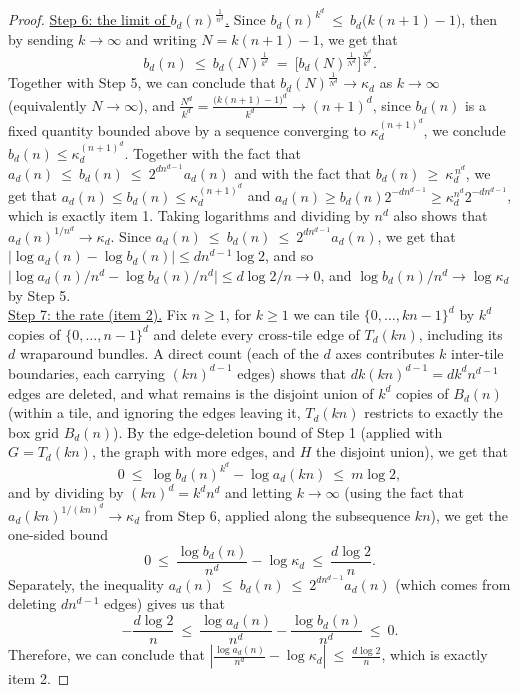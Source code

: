 \documentclass{article}
\theoremstyle{plain}
\theoremstyle{definition}
\theoremstyle{remark}
\begin{document}
\begin{proof}
\underline{Step 6: the limit of $b_d(n)^{\frac{1}{n^d}}$.} Since $b_d(n)^{k^d}\ \le\ b_d\big(k(n+1)-1\big)$, then by sending $k \to \infty$ and writing $N=k(n+1)-1$, we get that
\[
b_d(n)\ \le\ b_d(N)^{\frac{1}{k^d}}\ =\ \Big[b_d(N)^{\frac{1}{N^d}}\Big]^{\frac{N^d}{k^d}}.
\]
Together with Step 5, we can conclude that $b_d(N)^{\frac{1}{N^d}}\to\kappa_d$ as $k\to\infty$ (equivalently $N\to\infty$), and $\frac{N^d}{k^d}=\frac{\big(k(n+1)-1\big)^d}{k^d}\to(n+1)^d$, since $b_d(n)$ is a fixed quantity bounded above by a sequence converging to $\kappa_d^{(n+1)^d}$, we conclude $b_d(n)\le\kappa_d^{(n+1)^d}$. Together with the fact that $a_d(n)\ \le\ b_d(n)\ \le\ 2^{dn^{d-1}}a_d(n)$ and with the fact that $b_d(n)\ \ge\ \kappa_d^{\,n^d}$, we get that $a_d(n)\le b_d(n)\le\kappa_d^{(n+1)^d}$ and $a_d(n)\ge b_d(n)2^{-dn^{d-1}}\ge\kappa_d^{n^d}2^{-dn^{d-1}}$, which is exactly item 1. Taking logarithms and dividing by $n^d$ also shows that $a_d(n)^{1/n^d}\to\kappa_d$. Since $a_d(n)\ \le\ b_d(n)\ \le\ 2^{dn^{d-1}}a_d(n)$, we get that $|\log a_d(n)-\log b_d(n)|\le dn^{d-1}\log2$, and so $\big|\log a_d(n)/n^d-\log b_d(n)/n^d\big|\le d\log2/n\to0$, and $\log b_d(n)/n^d\to\log\kappa_d$ by Step 5.\\

\underline{Step 7: the rate (item 2).} Fix $n\ge1$, for $k\ge1$ we can tile $\{0,\dots,kn-1\}^d$ by $k^d$ copies of $\{0,\dots,n-1\}^d$ and delete every cross-tile edge of $T_d(kn)$, including its $d$ wraparound bundles. A direct count (each of the $d$ axes contributes $k$ inter-tile boundaries, each carrying $(kn)^{d-1}$ edges) shows that $dk(kn)^{d-1}=dk^dn^{d-1}$ edges are deleted, and what remains is the disjoint union of $k^d$ copies of $B_d(n)$ (within a tile, and ignoring the edges leaving it, $T_d(kn)$ restricts to exactly the box grid $B_d(n)$). By the edge-deletion bound of Step 1 (applied with $G=T_d(kn)$, the graph with more edges, and $H$ the disjoint union), we get that
\[
0\ \le\ \log b_d(n)^{k^d}-\log a_d(kn)\ \le\ m\log2,
\]
and by dividing by $(kn)^d=k^dn^d$ and letting $k\to\infty$ (using the fact that $a_d(kn)^{1/(kn)^d}\to\kappa_d$ from Step 6, applied along the subsequence $kn$), we get the one-sided bound
\begin{equation*}
0\ \le\ \frac{\log b_d(n)}{n^d}-\log\kappa_d\ \le\ \frac{d\log2}n.
\end{equation*}
Separately, the inequality $a_d(n)\ \le\ b_d(n)\ \le\ 2^{dn^{d-1}}a_d(n)$ (which comes from deleting $dn^{d-1}$ edges) gives us that
\begin{equation*}
-\frac{d\log2}n\ \le\ \frac{\log a_d(n)}{n^d}-\frac{\log b_d(n)}{n^d}\ \le\ 0.
\end{equation*}
Therefore, we can conclude that $\left|\frac{\log a_d(n)}{n^d}-\log\kappa_d\right|\ \le\ \frac{d\log2}n$, which is exactly item 2.
\end{proof}
\end{document}
